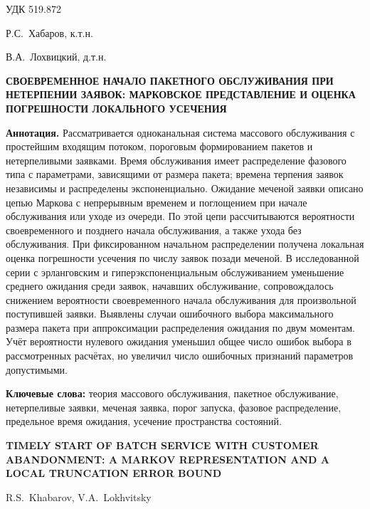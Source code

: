 \noindent УДК 519.872

\bigskip
\noindent Р.С.~Хабаров, к.т.н.\par
\noindent В.А.~Лохвицкий, д.т.н.

\begin{center}
{\large\bfseries СВОЕВРЕМЕННОЕ НАЧАЛО ПАКЕТНОГО ОБСЛУЖИВАНИЯ ПРИ НЕТЕРПЕНИИ ЗАЯВОК: МАРКОВСКОЕ ПРЕДСТАВЛЕНИЕ И ОЦЕНКА ПОГРЕШНОСТИ ЛОКАЛЬНОГО УСЕЧЕНИЯ}
\end{center}

\noindent\textbf{Аннотация.}
Рассматривается одноканальная система массового обслуживания с простейшим входящим потоком, пороговым формированием пакетов и нетерпеливыми заявками. Время обслуживания имеет распределение фазового типа с параметрами, зависящими от размера пакета; времена терпения заявок независимы и распределены экспоненциально. Ожидание меченой заявки описано цепью Маркова с непрерывным временем и поглощением при начале обслуживания или уходе из очереди. По этой цепи рассчитываются вероятности своевременного и позднего начала обслуживания, а также ухода без обслуживания. При фиксированном начальном распределении получена локальная оценка погрешности усечения по числу заявок позади меченой. В исследованной серии с эрланговским и гиперэкспоненциальным обслуживанием уменьшение среднего ожидания среди заявок, начавших обслуживание, сопровождалось снижением вероятности своевременного начала обслуживания для произвольной поступившей заявки. Выявлены случаи ошибочного выбора максимального размера пакета при аппроксимации распределения ожидания по двум моментам. Учёт вероятности нулевого ожидания уменьшил общее число ошибок выбора в рассмотренных расчётах, но увеличил число ошибочных признаний параметров допустимыми.

\medskip
\noindent\textbf{Ключевые слова:} теория массового обслуживания, пакетное обслуживание, нетерпеливые заявки, меченая заявка, порог запуска, фазовое распределение, предельное время ожидания, усечение пространства состояний.

\begin{center}
\textbf{TIMELY START OF BATCH SERVICE WITH CUSTOMER ABANDONMENT: A MARKOV REPRESENTATION AND A LOCAL TRUNCATION ERROR BOUND}

R.S.~Khabarov, V.A.~Lokhvitsky
\end{center}

